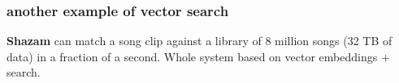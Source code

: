 \documentclass[compress]{beamer}
\begin{document}
\begin{frame}
	\frametitle{another example of vector search}
	\begin{center}
			\textbf{Shazam} can match a song clip against a library of 8 million songs (32 TB of data) in a fraction of a second. Whole system based on vector embeddings + search.
			
		\end{center}
	\vspace{-1em}
\end{frame}
\end{document}
